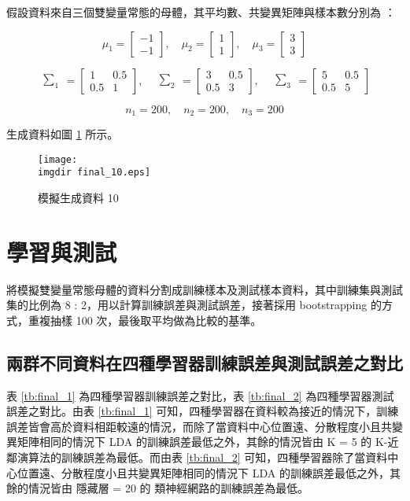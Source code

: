 假設資料來自三個雙變量常態的母體，其平均數、共變異矩陣與樣本數分別為 ：

\[\mu_1 = \begin{bmatrix}
-1 \\
-1
\end{bmatrix}, \quad \mu_2 = \begin{bmatrix}
1 \\
1
\end{bmatrix}, \quad \mu_3 = \begin{bmatrix}
3 \\
3
\end{bmatrix}\]

\[\begin{matrix} \sum_{1} \end{matrix} = \begin{bmatrix}
1 & 0.5\\
0.5 & 1
\end{bmatrix}, \quad \begin{matrix} \sum_{2} \end{matrix} = \begin{bmatrix}
3 & 0.5\\
0.5 & 3
\end{bmatrix}, \quad \begin{matrix} \sum_{3} \end{matrix} = \begin{bmatrix}
5 & 0.5\\
0.5 & 5
\end{bmatrix}\]

\[n_1 = 200, \quad n_2 = 200, \quad n_3 = 200\]

生成資料如圖 \ref{fig:final_10} 所示。
\begin{figure}[H]
    \centering
        \texttt{[image: \\imgdir final\_10.eps]}
    \caption{模擬生成資料 10}
    \label{fig:final_10}
\end{figure}

\section{學習與測試}
將模擬雙變量常態母體的資料分割成訓練樣本及測試樣本資料，其中訓練集與測試集的比例為 8 : 2，用以計算訓練誤差與測試誤差，接著採用 bootstrapping 的方式，重複抽樣 100 次，最後取平均做為比較的基準。

\subsection{兩群不同資料在四種學習器訓練誤差與測試誤差之對比}
表 \ref{tb:final_1} 為四種學習器訓練誤差之對比，表 \ref{tb:final_2} 為四種學習器測試誤差之對比。由表 \ref{tb:final_1} 可知，四種學習器在資料較為接近的情況下，訓練誤差皆會高於資料相距較遠的情況，而除了當資料中心位置遠、分散程度小且共變異矩陣相同的情況下 LDA 的訓練誤差最低之外，其餘的情況皆由 K = 5 的 K-近鄰演算法的訓練誤差為最低。而由表 \ref{tb:final_2} 可知，四種學習器除了當資料中心位置遠、分散程度小且共變異矩陣相同的情況下 LDA 的訓練誤差最低之外，其餘的情況皆由 隱藏層 = 20 的 類神經網路的訓練誤差為最低。


